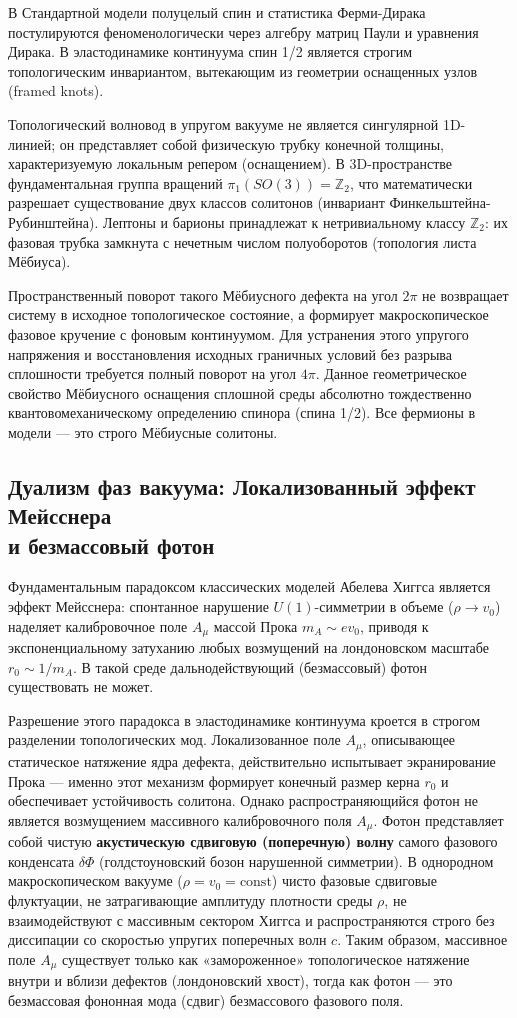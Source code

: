 \documentclass[11pt,a4paper]{article}
\begin{document}
	В Стандартной модели полуцелый спин и статистика Ферми-Дирака постулируются феноменологически через алгебру матриц Паули и уравнения Дирака. В эластодинамике континуума спин 1/2 является строгим топологическим инвариантом, вытекающим из геометрии оснащенных узлов (framed knots).

Топологический волновод в упругом вакууме не является сингулярной 1D-линией; он представляет собой физическую трубку конечной толщины, характеризуемую локальным репером (оснащением). В 3D-пространстве фундаментальная группа вращений $\pi_1(SO(3)) = \mathbb{Z}_2$, что математически разрешает существование двух классов солитонов (инвариант Финкельштейна-\\Рубинштейна).
Лептоны и барионы принадлежат к нетривиальному классу $\mathbb{Z}_2$: их фазовая трубка замкнута с нечетным числом полуоборотов (топология листа Мёбиуса). 

Пространственный поворот такого Мёбиусного дефекта на угол $2\pi$ не возвращает систему в исходное топологическое состояние, а формирует макроскопическое фазовое кручение с фоновым континуумом. Для устранения этого упругого напряжения и восстановления исходных граничных условий без разрыва сплошности требуется полный поворот на угол $4\pi$. Данное геометрическое свойство Мёбиусного оснащения сплошной среды абсолютно тождественно квантовомеханическому определению спинора (спина 1/2). Все фермионы в модели — это строго Мёбиусные солитоны.

\subsection{Дуализм фаз вакуума: Локализованный эффект Мейсснера\\ и безмассовый фотон}
Фундаментальным парадоксом классических моделей Абелева Хиггса является эффект Мейсснера: спонтанное нарушение $U(1)$-симметрии в объеме ($\rho \to v_0$) наделяет калибровочное поле $A_\mu$ массой Прока $m_A \sim e v_0$, приводя к экспоненциальному затуханию любых возмущений на лондоновском масштабе $r_0 \sim 1/m_A$. В такой среде дальнодействующий (безмассовый) фотон существовать не может.

Разрешение этого парадокса в эластодинамике континуума кроется в строгом разделении топологических мод. Локализованное поле $A_\mu$, описывающее статическое натяжение ядра дефекта, действительно испытывает экранирование Прока — именно этот механизм формирует конечный размер керна $r_0$ и обеспечивает устойчивость солитона.
Однако распространяющийся фотон не является возмущением массивного калибровочного поля $A_\mu$. Фотон представляет собой чистую \textbf{акустическую сдвиговую (поперечную) волну} самого фазового конденсата $\delta \Phi$ (голдстоуновский бозон нарушенной симметрии). В однородном макроскопическом вакууме ($\rho = v_0 = \text{const}$) чисто фазовые сдвиговые флуктуации, не затрагивающие амплитуду плотности среды $\rho$, не взаимодействуют с массивным сектором Хиггса и распространяются строго без диссипации со скоростью упругих поперечных волн $c$. 
Таким образом, массивное поле $A_\mu$ существует только как «замороженное» топологическое натяжение внутри и вблизи дефектов (лондоновский хвост), тогда как фотон — это безмассовая фононная мода (сдвиг) безмассового фазового поля.
	
\end{document}
